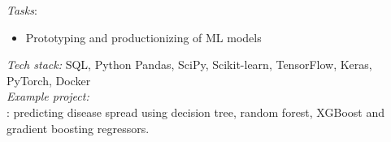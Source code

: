 \documentclass[
	a4paper,
]{fortysecondscv}
\begin{document}
\begin{cvtable}[1.0]

	{\href{https://datascienceretreat.com}{\color{pblue}{Data Science Retreat, Germany}}}
	{\textit{Tasks}: 
    \begin{itemize}[topsep=0pt,itemsep=0pt,partopsep=0pt, parsep=0pt, leftmargin=*]
     \setlength\itemsep{1mm}
     \item Prototyping and productionizing of ML models
    \end{itemize}
    \textit{Tech stack:} SQL, Python Pandas, SciPy, Scikit-learn, TensorFlow, Keras, PyTorch, Docker\\
    \textit{Example project:}\\
    \href{https://github.com/OnurKerimoglu/Dengue}{\color{pblue}{Dengue}}: predicting disease spread using decision tree, random forest, XGBoost and gradient boosting regressors.
    }
    

\end{cvtable}
\end{document}
